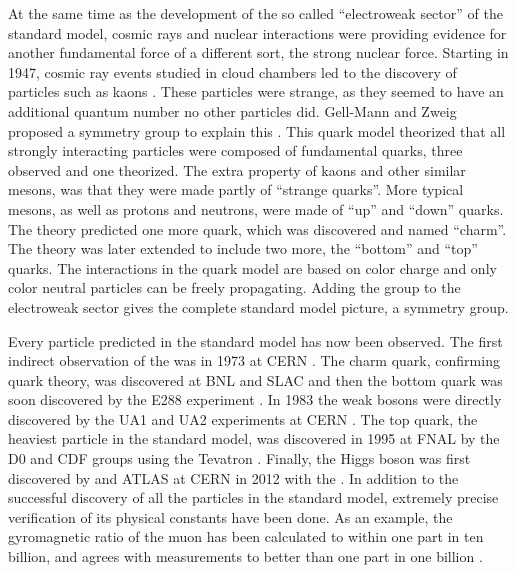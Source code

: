 At the same time as the development of the so called ``electroweak sector'' of the standard model, cosmic rays and nuclear interactions were providing evidence for another fundamental force of a different sort, the strong nuclear force.  Starting in 1947, cosmic ray events studied in cloud chambers led to the discovery of particles such as kaons \cite{1947Natur.160..855R}.  These particles were strange, as they seemed to have an additional quantum number no other particles did.  Gell-Mann and Zweig proposed a symmetry group \SUthree to explain this \cite{osti_4082875} \cite{Zweig:352337}.  This quark model theorized that all strongly interacting particles were composed of fundamental quarks, three observed and one theorized.  The extra property of kaons and other similar mesons, was that they were made partly of ``strange quarks''.  More typical mesons, as well as protons and neutrons, were made of ``up'' and ``down'' quarks.  The theory predicted one more quark, which was discovered and named ``charm''. The theory was later extended to include two more, the ``bottom'' and ``top'' quarks.  The interactions in the quark model are based on color charge and only color neutral particles can be freely propagating.  Adding the \SUthree group to the electroweak sector gives the complete standard model picture, a \SUthreeSUtwoUone symmetry group.

Every particle predicted in the standard model has now been observed.  The first indirect observation of the \Z was in 1973 at CERN \cite{HASERT1973121}.  The charm quark, confirming quark theory, was discovered at BNL and SLAC and then the bottom quark was soon discovered by the E288 experiment \cite{Aubert:1974js}\cite{Augustin:1974xw}\cite{Herb:1977ek}.  In 1983 the weak bosons were directly discovered by the UA1 and UA2 experiments at CERN \cite{Arnison:1983mk}\cite{Bagnaia:1983zx}\cite{Arnison:1983rp}\cite{Banner:1983jy}.  The top quark, the heaviest particle in the standard model, was discovered in 1995 at FNAL by the D0 and CDF groups using the Tevatron \cite{d4eca9bf1d5f49f3a4adc794f80c0a00}\cite{Abachi:1994td}.  Finally, the Higgs boson was first discovered by \CMS and ATLAS at CERN in 2012 with the \LHC.  In addition to the successful discovery of all the particles in the standard model, extremely precise verification of its physical constants have been done.  As an example, the gyromagnetic ratio of the muon has been calculated to within one part in ten billion, and agrees with measurements to better than one part in one billion \cite{PhysRevD.98.030001}.

